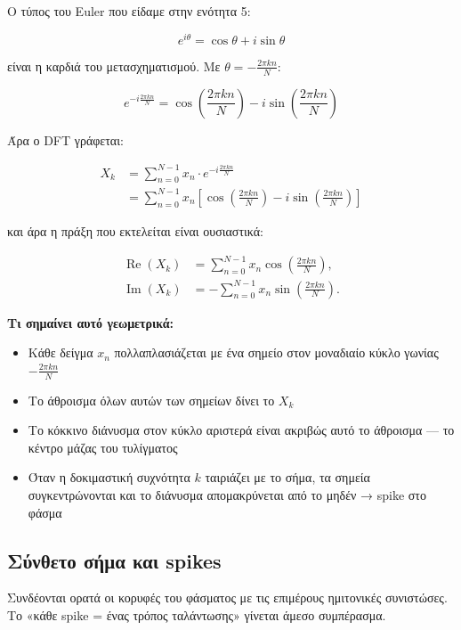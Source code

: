 \documentclass[a4paper, 11pt]{article}
\providecommand{\tightlist}{\setlength{\itemsep}{0pt}\setlength{\parskip}{0pt}}
\begin{document}
Ο τύπος του Euler που είδαμε στην ενότητα 5:

\[e^{i\theta} = \cos\theta + i\sin\theta\]

είναι η καρδιά του μετασχηματισμού. Με \(\theta = -\frac{2\pi kn}{N}\):

\[e^{-i\frac{2\pi kn}{N}} = \cos\!\left(\frac{2\pi kn}{N}\right) - i\sin\!\left(\frac{2\pi kn}{N}\right)\]

Άρα ο DFT γράφεται:

\[\begin{split}
X_k &= \sum_{n=0}^{N-1} x_n \cdot e^{-i\frac{2\pi kn}{N}} \\[6pt]
    &= \sum_{n=0}^{N-1} x_n \left[\cos\!\left(\frac{2\pi kn}{N}\right)
       - i\sin\!\left(\frac{2\pi kn}{N}\right)\right]
\end{split}\]

και άρα η πράξη που εκτελείται είναι ουσιαστικά:

\[\begin{split}
\operatorname{Re}(X_k) &= \sum_{n=0}^{N-1} x_n\cos\!\left(\frac{2\pi kn}{N}\right), \\
\operatorname{Im}(X_k) &= -\sum_{n=0}^{N-1} x_n\sin\!\left(\frac{2\pi kn}{N}\right).
\end{split}\]

\textbf{Τι σημαίνει αυτό γεωμετρικά:}

\begin{itemize}
\tightlist
\item
  Κάθε δείγμα \(x_n\) πολλαπλασιάζεται με ένα σημείο στον μοναδιαίο
  κύκλο γωνίας \(-\frac{2\pi kn}{N}\)
\item
  Το άθροισμα όλων αυτών των σημείων δίνει το \(X_k\)
\item
  Το κόκκινο διάνυσμα στον κύκλο αριστερά είναι ακριβώς αυτό το άθροισμα
  --- το κέντρο μάζας του τυλίγματος
\item
  Όταν η δοκιμαστική συχνότητα \(k\) ταιριάζει με το σήμα, τα σημεία
  συγκεντρώνονται και το διάνυσμα απομακρύνεται από το μηδέν → spike στο
  φάσμα
\end{itemize}

\subsection{Σύνθετο σήμα και
spikes}\label{ux3c3ux3cdux3bdux3b8ux3b5ux3c4ux3bf-ux3c3ux3aeux3bcux3b1-ux3baux3b1ux3b9-spikes}

Συνδέονται ορατά οι κορυφές του φάσματος με τις επιμέρους ημιτονικές
συνιστώσες. Το «κάθε spike = ένας τρόπος ταλάντωσης» γίνεται άμεσο
συμπέρασμα.
\end{document}
